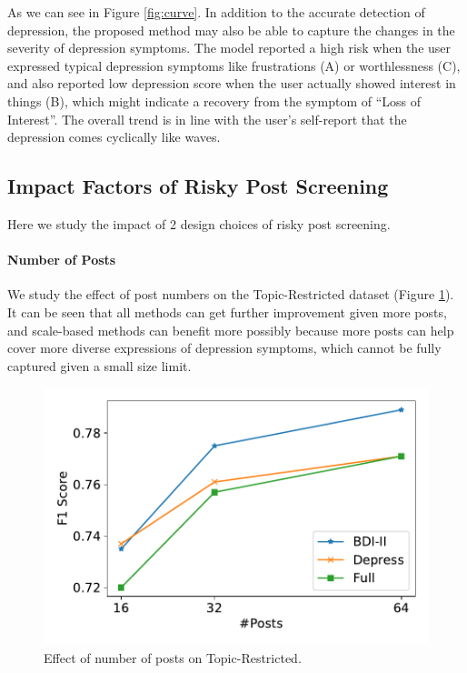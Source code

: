 As we can see in Figure \ref{fig:curve}. In addition to the accurate detection of depression, the proposed method may also be able to capture the changes in the severity of depression symptoms. The model reported a high risk when the user expressed typical depression symptoms like frustrations (A) or worthlessness (C), and also reported low depression score when the user actually showed interest in things (B), which might indicate a recovery from the symptom of ``Loss of Interest''. The overall trend is in line with the user's self-report that the depression comes cyclically like waves.


\subsection{Impact Factors of Risky Post Screening}
\label{sec:factor}

Here we study the impact of 2 design choices of risky post screening.

\paragraph{Number of Posts} 
We study the effect of post numbers on the Topic-Restricted dataset (Figure \ref{fig:post_numbers}). It can be seen that all methods can get further improvement given more posts, and scale-based methods can benefit more possibly because more posts can help cover more diverse expressions of depression symptoms, which cannot be fully captured given a small size limit.

\begin{figure}[h]
    \centering
    \includegraphics[width=0.8\columnwidth]{figures/post_numbers.pdf}
    \caption{Effect of number of posts on Topic-Restricted.}
    \label{fig:post_numbers}
\end{figure}

